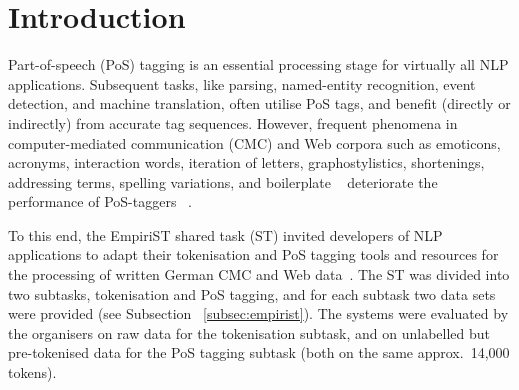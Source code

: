 \documentclass[11pt]{article}
\title{\mytitle}
\author{Egon W.~Stemle \\
  EURAC research \\
  Bozen-Bolzano, Italy \\
  {\tt egon.stemle@eurac.edu}}
\date{}
\begin{document}
\maketitle

\begin{abstract} %
    This article describes the system that participated in the Part-of-speech
    tagging subtask of the \emph{EmpiriST 2015 shared task on automatic
    linguistic annotation of computer-mediated communication / social
    media}.

    The system combines a small assertion of trending techniques, which
    implement matured methods, from NLP and ML to achieve competitive results
    on PoS tagging of German CMC and Web corpus data; in particular, the system
    uses word embeddings and character-level representations of word beginnings
    and endings in a LSTM RNN architecture.  
    Labelled data (Tiger v2.2 and EmpiriST) and unlabelled data (German
    Wikipedia) were used for training.

    The system is available under the APLv2 open-source license.
\end{abstract}


\section{Introduction} %
\label{sec:intro}

Part-of-speech (PoS) tagging is an essential processing stage for virtually all
NLP applications.
Subsequent tasks, like parsing, named-entity recognition, event
detection, and machine translation, often utilise PoS tags, and benefit
(directly or indirectly) from accurate tag sequences.
However, frequent phenomena in computer-mediated communication (CMC) and Web
corpora such as emoticons, acronyms, interaction words, iteration of letters,
graphostylistics, shortenings, addressing terms, spelling variations, and
boilerplate%
~\cite{androutsopoulos2007,BernardiniBaroniEvert2008,beisswenger2013}
deteriorate the performance of PoS-taggers%
~\cite{giesbrecht2009,baldwin-EtAl:2013:IJCNLP}.

To this end, the EmpiriST shared task (ST) invited developers of NLP
applications to adapt their tokenisation and PoS tagging tools and resources
for the processing of written German CMC and Web data~\cite{empirist2016}. 
The ST was divided into two subtasks, tokenisation and PoS tagging, and
for each subtask two data sets were provided (see Subsection%
~\ref{subsec:empirist}).
The systems were evaluated by the organisers on raw data for the tokenisation
subtask, and on unlabelled but pre-tokenised data for the PoS tagging subtask
(both on the same approx.~14,000 tokens).
\end{document}

